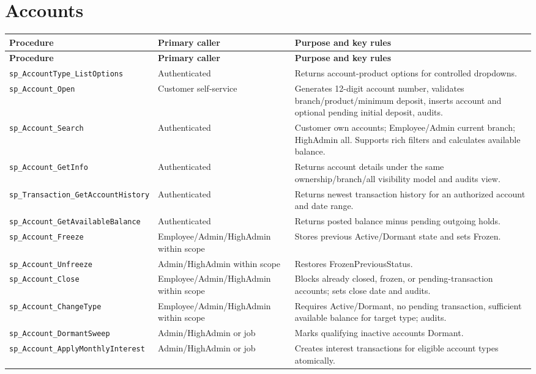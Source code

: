 \documentclass[11pt,a4paper,oneside]{report}
\begin{document}
\section{Accounts}
\begingroup
\footnotesize
\setlength{\tabcolsep}{4pt}
\renewcommand{\arraystretch}{1.08}
\begin{longtable}{L{0.30\textwidth}L{0.22\textwidth}L{0.41\textwidth}}
\toprule\textbf{Procedure} & \textbf{Primary caller} & \textbf{Purpose and key rules}\\\midrule\endfirsthead
\toprule\textbf{Procedure} & \textbf{Primary caller} & \textbf{Purpose and key rules}\\\midrule\endhead
\nolinkurl{sp_AccountType_ListOptions} & Authenticated & Returns account-product options for controlled dropdowns.\\
\nolinkurl{sp_Account_Open} & Customer self-service & Generates 12-digit account number, validates branch\slash product\slash minimum deposit, inserts account and optional pending initial deposit, audits.\\
\nolinkurl{sp_Account_Search} & Authenticated & Customer own accounts; Employee\slash Admin current branch; HighAdmin all. Supports rich filters and calculates available balance.\\
\nolinkurl{sp_Account_GetInfo} & Authenticated & Returns account details under the same ownership\slash branch\slash all visibility model and audits view.\\
\nolinkurl{sp_Transaction_GetAccountHistory} & Authenticated & Returns newest transaction history for an authorized account and date range.\\
\nolinkurl{sp_Account_GetAvailableBalance} & Authenticated & Returns posted balance minus pending outgoing holds.\\
\nolinkurl{sp_Account_Freeze} & Employee\slash Admin\slash HighAdmin within scope & Stores previous Active\slash Dormant state and sets Frozen.\\
\nolinkurl{sp_Account_Unfreeze} & Admin\slash HighAdmin within scope & Restores FrozenPreviousStatus.\\
\nolinkurl{sp_Account_Close} & Employee\slash Admin\slash HighAdmin within scope & Blocks already closed, frozen, or pending-transaction accounts; sets close date and audits.\\
\nolinkurl{sp_Account_ChangeType} & Employee\slash Admin\slash HighAdmin within scope & Requires Active\slash Dormant, no pending transaction, sufficient available balance for target type; audits.\\
\nolinkurl{sp_Account_DormantSweep} & Admin\slash HighAdmin or job & Marks qualifying inactive accounts Dormant.\\
\nolinkurl{sp_Account_ApplyMonthlyInterest} & Admin\slash HighAdmin or job & Creates interest transactions for eligible account types atomically.\\
\bottomrule
\end{longtable}
\endgroup
\end{document}
